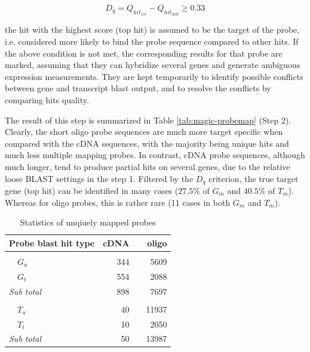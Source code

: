 \begin{equation}
D_q = Q_{hit_{1st}} - Q_{hit_{2nd}} \geq 0.33
\end{equation}

the hit with the highest score (top hit) is assumed to be the target of the 
probe, i.e. considered more likely to bind the probe sequence compared to other 
hits. 
If the above condition is not met, the corresponding results for that 
probe are marked, assuming that they can hybridize several genes and generate 
ambiguous expression measurements. 
They are kept temporarily to identify possible conflicts between gene and 
transcript blast output, and to resolve the conflicts by comparing hits quality. 

The result of this step is summarized in Table \ref{tab:magic-probemap} (Step 2). 
Clearly, the short oligo probe sequences are much more target specific when 
compared with the cDNA sequences, with the majority being unique hits and much 
less multiple mapping probes.
In contrast, cDNA probe sequences, although much longer, tend to produce 
partial hits on several genes, due to the relative loose BLAST settings in the 
step 1. 
Filtered by the $D_q$ criterion, the true target gene (top hit) can be 
identified in many cases ($27.5\%$ of $G_m$ and $40.5\%$ of $T_m$).
Whereas for oligo probes, this is rather rare (11 cases in both $G_m$ and 
$T_m$).

\begin{table}[tb]
	\centering
	\begin{threeparttable}
	\begin{footnotesize}
	\caption{Statistics of unqiuely mapped probes} 
	\label{tab:magic-uniquemaps}
	\begin{tabular}{@{}>{\centering\arraybackslash}p{5cm}rcr}
	\toprule
	 \textbf{Probe blast hit type} & \textbf{cDNA} & \phantom{a} & 
	 \textbf{oligo} \\
	\midrule
	
	\multicolumn{4}{l}{\textit{Gene blast}} \\
	~~$G_u$ & 344 && 5609 \\
	~~$G_t$ & 554 && 2088 \\
	\textit{Sub total} & 898 && 7697 \\[1.5ex]

	\multicolumn{4}{l}{\textit{Transcript blast}} \\
	~~$T_u$ & 40 && 11937 \\
	~~$T_t$ & 10 && 2050 \\
	\textit{Sub total} & 50 && 13987 \\

	\bottomrule
	\end{tabular}
	\end{footnotesize}
	\end{threeparttable}
\end{table}


